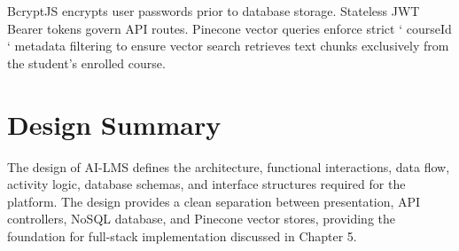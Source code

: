 BcryptJS encrypts user passwords prior to database storage. Stateless JWT Bearer tokens govern API routes. Pinecone vector queries enforce strict `{ courseId }` metadata filtering to ensure vector search retrieves text chunks exclusively from the student's enrolled course.

\section{Design Summary}

The design of AI-LMS defines the architecture, functional interactions, data flow, activity logic, database schemas, and interface structures required for the platform. The design provides a clean separation between presentation, API controllers, NoSQL database, and Pinecone vector stores, providing the foundation for full-stack implementation discussed in Chapter 5.
